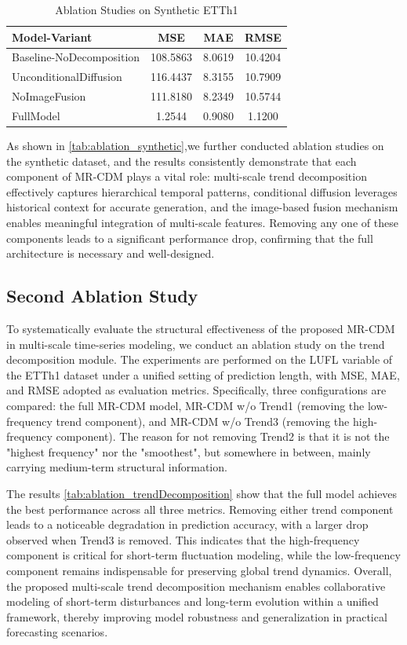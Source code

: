 \begin{table}[h]
\centering
\caption{Ablation Studies on Synthetic ETTh1}
\label{tab:ablation_synthetic}
\begin{tabular}{lccc}
\hline
Model-Variant & MSE & MAE & RMSE \\ \hline
Baseline-NoDecomposition & {108.5863} & {8.0619} & {10.4204} \\
UnconditionalDiffusion & {116.4437} & {8.3155} & {10.7909} \\
NoImageFusion & {111.8180} & {8.2349} & {10.5744}\\
FullModel & {1.2544} & {0.9080} & {1.1200 }\\
\hline
\end{tabular}
\end{table}
As shown in \autoref{tab:ablation_synthetic},we further conducted ablation studies on the synthetic dataset, and the results consistently demonstrate that each component of MR-CDM plays a vital role: multi-scale trend decomposition effectively captures hierarchical temporal patterns, conditional diffusion leverages historical context for accurate generation, and the image-based fusion mechanism enables meaningful integration of multi-scale features. Removing any one of these components leads to a significant performance drop, confirming that the full architecture is necessary and well-designed.

\subsection{Second Ablation Study}
\label{sec:ablation2}
To systematically evaluate the structural effectiveness of the proposed MR-CDM in multi-scale time-series modeling, we conduct an ablation study on the trend decomposition module. The experiments are performed on the LUFL variable of the ETTh1 dataset under a unified setting of prediction length, with MSE, MAE, and RMSE adopted as evaluation metrics. Specifically, three configurations are compared: the full MR-CDM model, MR-CDM w/o Trend1 (removing the low-frequency trend component), and MR-CDM w/o Trend3 (removing the high-frequency component). The reason for not removing Trend2 is that it is not the "highest frequency" nor the "smoothest", but somewhere in between, mainly carrying medium-term structural information.

The results \autoref{tab:ablation_trendDecomposition} show that the full model achieves the best performance across all three metrics. Removing either trend component leads to a noticeable degradation in prediction accuracy, with a larger drop observed when Trend3 is removed. This indicates that the high-frequency component is critical for short-term fluctuation modeling, while the low-frequency component remains indispensable for preserving global trend dynamics. Overall, the proposed multi-scale trend decomposition mechanism enables collaborative modeling of short-term disturbances and long-term evolution within a unified framework, thereby improving model robustness and generalization in practical forecasting scenarios.

